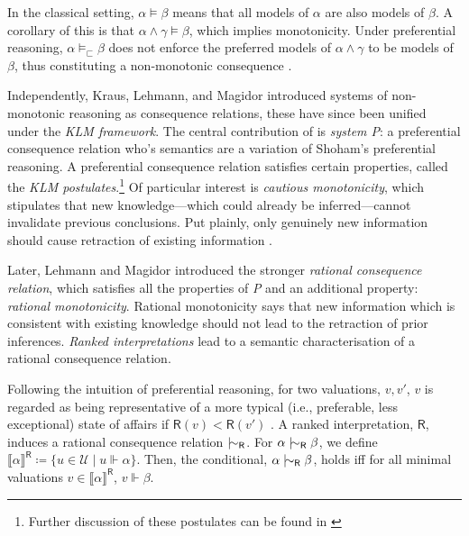 %
In the classical setting, $\alpha \vDash \beta$ means that all models of $\alpha$ are also models of $\beta$. A corollary of this is that $\alpha \wedge \gamma \vDash \beta$, which implies monotonicity. Under preferential reasoning, $\alpha \vDash_\sqsubset \beta$ does not enforce the preferred models of $\alpha \wedge \gamma$ to be models of $\beta$, thus constituting a non-monotonic consequence \cite{shoham1987nonmonotonic}.

Independently, Kraus, Lehmann, and Magidor \cite{kraus1990nonmonotonic} introduced systems of non-monotonic reasoning as consequence relations, these have since been unified under the \textit{KLM framework}. The central contribution of \cite{kraus1990nonmonotonic} is \textit{system P}: a preferential consequence relation who's semantics are a variation of Shoham's preferential reasoning. A preferential consequence relation satisfies certain properties, called the \textit{KLM postulates}.\footnote{Further discussion of these postulates can be found in \cite{kraus1990nonmonotonic}} Of particular interest is \textit{cautious monotonicity}, which stipulates that new knowledge—which could already be inferred—cannot invalidate previous conclusions. Put plainly, only genuinely new information should cause retraction of existing information \cite{kraus1990nonmonotonic,kaliski2020overview}.

Later, Lehmann and Magidor \cite{lehmann1994what} introduced the stronger  \textit{rational consequence relation}, which  satisfies all the properties of \textit{P} and an additional property: \textit{rational monotonicity}. Rational monotonicity says that new information which is consistent with existing knowledge should not lead to the retraction of prior inferences. \textit{Ranked interpretations} lead to a semantic characterisation of a rational consequence relation.


Following the intuition of preferential reasoning, for two valuations, $v,v'$, $v$ is regarded as being representative of a more typical (i.e., preferable, less exceptional) state of affairs if $\mathsf{R}(v) < \mathsf{R}(v')$ \cite{lehmann1994what}. A ranked interpretation, $\mathsf{R}$, induces a rational consequence relation $\twiddle_\mathsf{R}$. For $\alpha \twiddle_\mathsf{R} \beta$, we define $\llbracket \alpha \rrbracket^\mathsf{R} \coloneq \{u \in \mathcal{U} \mid u \Vdash \alpha\}$. Then, the conditional, $\alpha \twiddle_\mathsf{R} \beta$, holds iff for all minimal valuations $v \in \llbracket \alpha \rrbracket^\mathsf{R}$, $v \Vdash \beta$.


